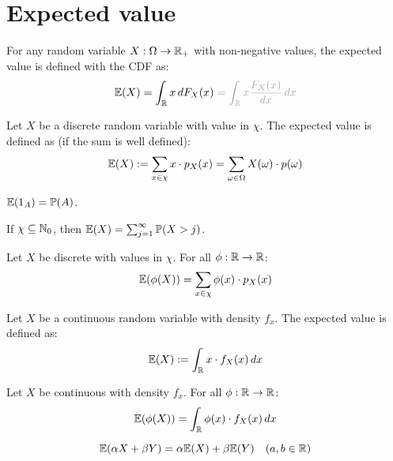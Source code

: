 \section{Expected value}

For any random variable \(X: \Omega \to \mathbb{R}_+\) with non-negative values, the expected value is defined with the CDF as:
\vspace{-8pt}
\[\E(X) = \int_\R x \,dF_X(x) \color{gray!70} = \int_\R x \frac{F_X(x)}{dx} \, dx\]

\begin{ddefinition*}
  Let \(X\) be a discrete random variable with value in \(\chi\). The expected value is defined as (if the sum is well defined):
  \vspace{-10pt}
  \[\mathbb{E}(X) := \sum_{x \in \chi}x \cdot p_X(x) = \sum_{\omega \in \Omega} X(\omega) \cdot p(\omega)\]
\end{ddefinition*}

\begin{proposition}
  {\small \(\mathbb{E}(1_A) = \mathbb{P}(A)\)}.
\end{proposition}

\begin{proposition}
  If \(\chi \subseteq \mathbb{N}_0\), then \(\mathbb{E}(X) = \sum_{j=1}^\infty \mathbb{P}(X > j)\).
\end{proposition}

\begin{dtheorem*}
  Let \(X\) be discrete with values in \(\chi\). For all \(\phi: \mathbb{R} \to \mathbb{R}\):
  \[\mathbb{E}(\phi(X)) = \sum_{x \in \chi}\phi(x) \cdot p_X(x)\]
\end{dtheorem*}

\begin{cdefinition*}
  Let \(X\) be a continuous random variable with density \(f_x\). The expected value is defined as:
  \[\mathbb{E}(X) := \int_{\mathbb{R}} x \cdot f_X(x) \,dx\]
\end{cdefinition*}

\begin{ctheorem*}
  Let \(X\) be continuous with density \(f_x\). For all \(\phi: \mathbb{R} \to \mathbb{R}\):
  \[\mathbb{E}(\phi(X)) = \int_{\mathbb{R}} \phi(x) \cdot f_X(x) \, dx\]
\end{ctheorem*}

\begin{theorem*}
  \[\mathbb{E}(\alpha X + \beta Y) = \alpha \mathbb{E}(X) + \beta \mathbb{E}(Y) \quad (a, b \in \mathbb{R})\]
\end{theorem*}

